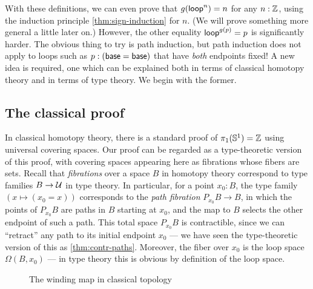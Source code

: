 With these definitions, we can even prove that $g(\mathsf{loop}^n)=n$ for any $n:\mathbb{Z}$, using the induction principle \autoref{thm:sign-induction} for $n$.
(We will prove something more general a little later on.)
However, the other equality $\mathsf{loop}^{g(p)}=p$ is significantly harder.
The obvious thing to try is path induction, but path induction does not apply to loops such as $p:(\mathsf{base}=\mathsf{base})$ that have \emph{both} endpoints fixed!
A new idea is required, one which can be explained both in terms of classical homotopy theory and in terms of type theory.
We begin with the former.


\subsection{The classical proof}
\label{sec:pi1s1-classical-proof}

In classical homotopy theory, there is a standard proof of $\pi_1(\mathbb{S}^1)=\mathbb{Z}$ using universal covering spaces.
Our proof can be regarded as a type-theoretic version of this proof, with covering spaces appearing here as fibrations whose fibers are sets.
Recall that \emph{fibrations} over a space $B$ in homotopy theory correspond to type families $B\to\mathcal{U}$ in type theory.
In particular, for a point $x_0:B$, the type family $(x\mapsto (x_0=x))$ corresponds to the \emph{path fibration} $P_{x_0} B \to B$, in which the points of $P_{x_0} B$ are paths in $B$ starting at $x_0$, and the map to $B$ selects the other endpoint of such a path.
This total space $P_{x_0} B$ is contractible, since we can ``retract'' any path to its initial endpoint $x_0$ --- we have seen the type-theoretic version of this as \autoref{thm:contr-paths}.
Moreover, the fiber over $x_0$ is the loop space $\Omega(B,x_0)$ --- in type theory this is obvious by definition of the loop space.

\begin{figure}\centering
  \caption{The winding map in classical topology}\label{fig:winding}
\end{figure}

